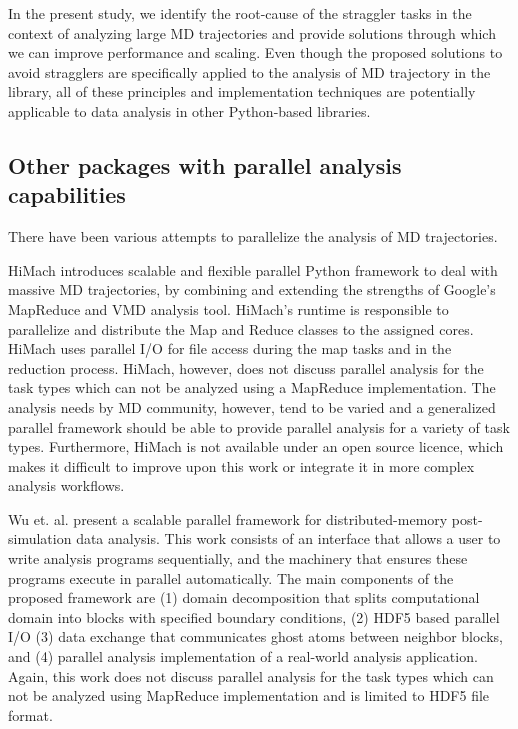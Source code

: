 In the present study, we identify the root-cause of the straggler tasks in the context of analyzing large MD trajectories and provide solutions through which we can improve performance and scaling.
Even though the proposed solutions to avoid stragglers are specifically applied to the analysis of MD trajectory in the  library, all of these principles and implementation techniques are potentially applicable to data analysis in other Python-based libraries.


\subsection{Other packages with parallel analysis capabilities}
\label{sec:otherparallel}

There have been various attempts to parallelize the analysis of MD trajectories. 

HiMach \cite{himach-2008} introduces scalable and flexible parallel Python framework to deal with massive MD trajectories, by combining and extending the strengths of Google's MapReduce and VMD analysis tool. 
HiMach's runtime is responsible to parallelize and distribute the Map and Reduce classes to the assigned cores.
HiMach uses parallel I/O for file access during the map tasks and  in the reduction process. 
HiMach, however, does not discuss parallel analysis for the task types which can not be analyzed using a MapReduce implementation.
The analysis needs by MD community, however, tend to be varied and a generalized parallel framework should be able to provide parallel analysis for a variety of task types.
Furthermore, HiMach is not available under an open source licence, which makes it difficult to improve upon this work or integrate it in more complex analysis workflows.

Wu et. al. \cite{Wu_et.al} present a scalable parallel framework for distributed-memory post-simulation data analysis.
This work consists of an interface that allows a user to write analysis programs sequentially, and the machinery that ensures these programs execute in parallel automatically. 
The main components of the proposed framework are (1) domain decomposition that splits computational domain into blocks with specified boundary conditions, (2) HDF5 based parallel I/O (3) data exchange that communicates ghost atoms between neighbor blocks, and (4) parallel analysis implementation of a real-world analysis application.
Again, this work does not discuss parallel analysis for the task types which can not be analyzed using MapReduce implementation and is limited to HDF5 file format.

